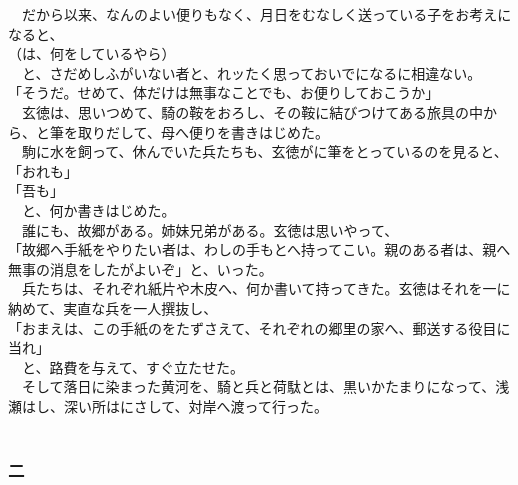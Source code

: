 \documentclass[
  paper=a5,
  fontsize=10pt,
  jafontsize=9.5pt,
  tate,                  %
  open_bracket_pos=nibu, %
]{jlreq}
\begin{document}
　だから以来、なんのよい便りもなく、月日をむなしく送っている子をお考えになると、\\


（は、何をしているやら）\\


　と、さだめしふがいない者と、れッたく思っておいでになるに相違ない。\\


「そうだ。せめて、体だけは無事なことでも、お便りしておこうか」\\


　玄徳は、思いつめて、騎の鞍をおろし、その鞍に結びつけてある旅具の中から、と筆を取りだして、母へ便りを書きはじめた。\\


　駒に水を飼って、休んでいた兵たちも、玄徳がに筆をとっているのを見ると、\\


「おれも」\\


「吾も」\\


　と、何か書きはじめた。\\


　誰にも、故郷がある。姉妹兄弟がある。玄徳は思いやって、\\


「故郷へ手紙をやりたい者は、わしの手もとへ持ってこい。親のある者は、親へ無事の消息をしたがよいぞ」と、いった。\\


　兵たちは、それぞれ紙片や木皮へ、何か書いて持ってきた。玄徳はそれを一に納めて、実直な兵を一人撰抜し、\\


「おまえは、この手紙のをたずさえて、それぞれの郷里の家へ、郵送する役目に当れ」\\


　と、路費を与えて、すぐ立たせた。\\


　そして落日に染まった黄河を、騎と兵と荷駄とは、黒いかたまりになって、浅瀬はし、深い所はにさして、対岸へ渡って行った。\\

\\

\subsubsection{二}
\end{document}

